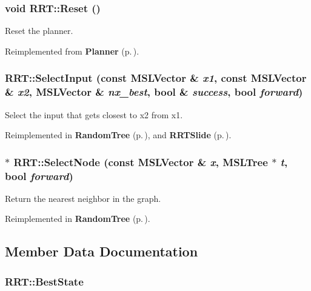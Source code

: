\subsubsection{\setlength{\rightskip}{0pt plus 5cm}void RRT::Reset ()\hspace{0.3cm}{\tt  [virtual]}}\label{class_RRT_a2}


Reset the planner.



Reimplemented from {\bf Planner} {\rm (p.\,\pageref{class_Planner_a2})}.
\subsubsection{ RRT::Select\-Input (const {\bf MSLVector} \& {\em x1}, const {\bf MSLVector} \& {\em x2}, {\bf MSLVector} \& {\em nx\_\-best}, bool \& {\em success}, bool {\em forward})\hspace{0.3cm}{\tt  [protected, virtual]}}\label{class_RRT_b0}


Select the input that gets closest to x2 from x1.



Reimplemented in {\bf Random\-Tree} {\rm (p.\,\pageref{class_RandomTree_b1})}, and {\bf RRTSlide} {\rm (p.\,\pageref{class_RRTSlide_a2})}.
\subsubsection{ $\ast$ RRT::Select\-Node (const {\bf MSLVector} \& {\em x}, {\bf MSLTree} $\ast$ {\em t}, bool {\em forward})\hspace{0.3cm}{\tt  [protected, virtual]}}\label{class_RRT_b1}


Return the nearest neighbor in the graph.



Reimplemented in {\bf Random\-Tree} {\rm (p.\,\pageref{class_RandomTree_b0})}.

\subsection{Member Data Documentation}
\subsubsection{ RRT::Best\-State}\label{class_RRT_m2}


